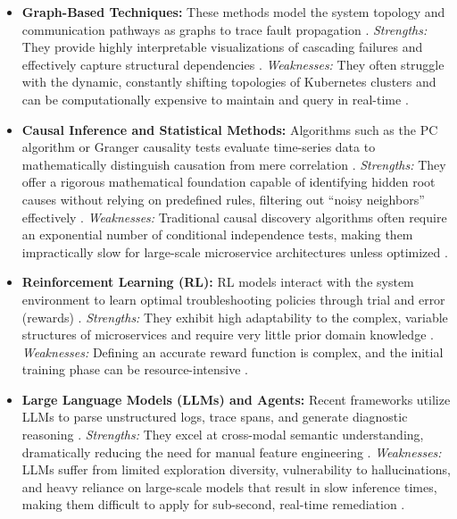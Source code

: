 \begin{itemize}
    \item \textbf{Graph-Based Techniques:} These methods model the system topology and communication pathways as graphs to trace fault propagation \cite{brandon_2020}. \textit{Strengths:} They provide highly interpretable visualizations of cascading failures and effectively capture structural dependencies \cite{brandon_2020, barata_2026}. \textit{Weaknesses:} They often struggle with the dynamic, constantly shifting topologies of Kubernetes clusters and can be computationally expensive to maintain and query in real-time \cite{barata_2026}.
    
    \item \textbf{Causal Inference and Statistical Methods:} Algorithms such as the PC algorithm or Granger causality tests evaluate time-series data to mathematically distinguish causation from mere correlation \cite{ikram_2022, wang_2024}. \textit{Strengths:} They offer a rigorous mathematical foundation capable of identifying hidden root causes without relying on predefined rules, filtering out ``noisy neighbors'' effectively \cite{ikram_2022}. \textit{Weaknesses:} Traditional causal discovery algorithms often require an exponential number of conditional independence tests, making them impractically slow for large-scale microservice architectures unless optimized \cite{ikram_2022}.
    
    \item \textbf{Reinforcement Learning (RL):} RL models interact with the system environment to learn optimal troubleshooting policies through trial and error (rewards) \cite{barata_2026}. \textit{Strengths:} They exhibit high adaptability to the complex, variable structures of microservices and require very little prior domain knowledge \cite{barata_2026, wang_2024}. \textit{Weaknesses:} Defining an accurate reward function is complex, and the initial training phase can be resource-intensive \cite{barata_2026}.
    
    \item \textbf{Large Language Models (LLMs) and Agents:} Recent frameworks utilize LLMs to parse unstructured logs, trace spans, and generate diagnostic reasoning \cite{yao_2024, tang_2025, zhang_2026}. \textit{Strengths:} They excel at cross-modal semantic understanding, dramatically reducing the need for manual feature engineering \cite{zhang_2026}. \textit{Weaknesses:} LLMs suffer from limited exploration diversity, vulnerability to hallucinations, and heavy reliance on large-scale models that result in slow inference times, making them difficult to apply for sub-second, real-time remediation \cite{yao_2024, zhang_2026}.
\end{itemize}

